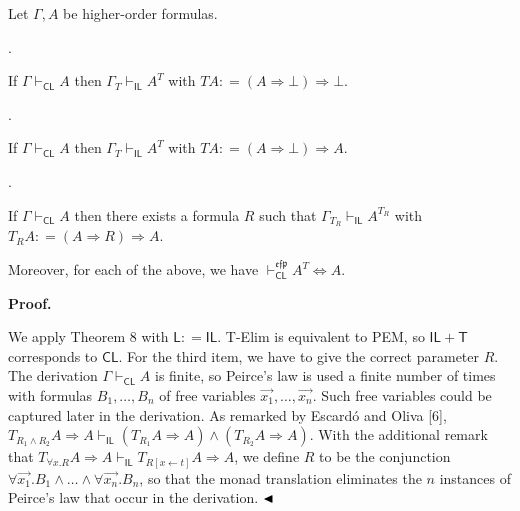 \documentclass[10pt,a4paper]{article}
\begin{document}
 
Let $\Gamma,A$ be higher-order formulas.\par
  
\par{}. 
 
If $\Gamma\vdash_{\mathsf{CL}}A$ then $\Gamma_{T}\vdash_{\mathsf{IL}}A^{T}$ with $TA\mathrel{\mathop{:}}=(A\mathbin{\Rightarrow}\bot)\mathbin{\Rightarrow}\bot$.\par
 
 
 
\par{}. 
 
If $\Gamma\vdash_{\mathsf{CL}}A$ then $\Gamma_{T}\vdash_{\mathsf{IL}}A^{T}$ with $TA\mathrel{\mathop{:}}=(A\mathbin{\Rightarrow}\bot)\mathbin{\Rightarrow}A$.\par
 
 
 
\par{}. 
 
If $\Gamma\vdash_{\mathsf{CL}}A$ then there exists a formula $R$ such that $\Gamma_{T_{R}}\vdash_{\mathsf{IL}}A^{T_{R}}$ with $T_{R}A\mathrel{\mathop{:}}=(A\mathbin{\Rightarrow}R)\mathbin{\Rightarrow}A$.\par
 
 
  
Moreover, for each of the above, we have $\vdash_{\mathsf{CL}}^{\mathfrak{e}\mathfrak{f}\mathfrak{p}}A^{T}\Leftrightarrow
A$.\par
 
 
 
 
\par\medskip\noindent\textbf{Proof.}\par
 
 
We apply Theorem 8 with $\mathsf{L}\mathrel{\mathop{:}}=\mathsf{IL}$. T-Elim is equivalent to PEM, so $\mathsf{IL}+\mathsf{T}$ corresponds to $\mathsf{CL}$. For the third item, we have to give the correct parameter $R$. The derivation $\Gamma\vdash_{\mathsf{CL}}A$ is finite, so Peirce’s law is used a finite number of times with formulas $B_{1},\ldots,B_{n}$ of free variables $\vec{x_{1}},\ldots,\vec{x_{n}}$. Such free variables could be captured later in the derivation. As remarked by Escardó and Oliva [6], $T_{R_{1}\mathbin{\wedge}R_{2}}A\mathbin{\Rightarrow}A\vdash_{\mathsf{IL}}(T_{R_{1}}A\mathbin{\Rightarrow}A)\mathbin{\wedge}(T_{R_{2}}A\mathbin{\Rightarrow}A)$. With the additional remark that $T_{{\forall}x.R}A\mathbin{\Rightarrow}A\vdash_{\mathsf{IL}}T_{R[x\leftarrow t]}A\mathbin{\Rightarrow}A$, we define $R$ to be the conjunction ${\forall}\vec{x_{1}}.B_{1}\mathbin{\wedge}\ldots\mathbin{\wedge}{\forall}\vec{x_{n}}.B_{n}$, so that the monad translation eliminates the $n$ instances of Peirce’s law that occur in the derivation. $\hfill\blacktriangleleft$\par
 
\end{document}
